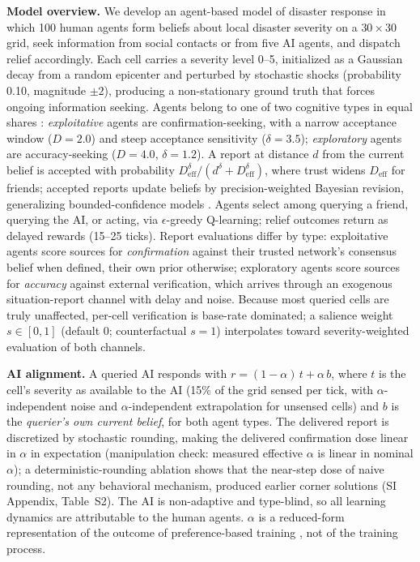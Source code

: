 \documentclass[pdflatex,sn-nature]{sn-jnl}
\begin{document}
\textbf{Model overview.} We develop an agent-based model of disaster response in which 100 human agents form beliefs about local disaster severity on a $30 \times 30$ grid, seek information from social contacts or from five AI agents, and dispatch relief accordingly. Each cell carries a severity level 0--5, initialized as a Gaussian decay from a random epicenter and perturbed by stochastic shocks (probability 0.10, magnitude $\pm 2$), producing a non-stationary ground truth that forces ongoing information seeking. Agents belong to one of two cognitive types in equal shares \citep{march1991exploration}: \emph{exploitative} agents are confirmation-seeking, with a narrow acceptance window ($D = 2.0$) and steep acceptance sensitivity ($\delta = 3.5$); \emph{exploratory} agents are accuracy-seeking ($D = 4.0$, $\delta = 1.2$). A report at distance $d$ from the current belief is accepted with probability $D_{\mathrm{eff}}^{\delta} / (d^{\delta} + D_{\mathrm{eff}}^{\delta})$, where trust widens $D_{\mathrm{eff}}$ for friends; accepted reports update beliefs by precision-weighted Bayesian revision, generalizing bounded-confidence models \citep{deffuant2000mixing,hegselmann2002opinion}. Agents select among querying a friend, querying the AI, or acting, via $\epsilon$-greedy Q-learning; relief outcomes return as delayed rewards (15--25 ticks). Report evaluations differ by type: exploitative agents score sources for \emph{confirmation} against their trusted network's consensus belief when defined, their own prior otherwise; exploratory agents score sources for \emph{accuracy} against external verification, which arrives through an exogenous situation-report channel with delay and noise. Because most queried cells are truly unaffected, per-cell verification is base-rate dominated; a salience weight $s \in [0,1]$ (default 0; counterfactual $s=1$) interpolates toward severity-weighted evaluation of both channels.

\textbf{AI alignment.} A queried AI responds with $r = (1-\alpha)\,t + \alpha\,b$, where $t$ is the cell's severity as available to the AI (15\% of the grid sensed per tick, with $\alpha$-independent noise and $\alpha$-independent extrapolation for unsensed cells) and $b$ is the \emph{querier's own current belief}, for both agent types. The delivered report is discretized by stochastic rounding, making the delivered confirmation dose linear in $\alpha$ in expectation (manipulation check: measured effective $\alpha$ is linear in nominal $\alpha$); a deterministic-rounding ablation shows that the near-step dose of naive rounding, not any behavioral mechanism, produced earlier corner solutions (SI Appendix, Table~S2). The AI is non-adaptive and type-blind, so all learning dynamics are attributable to the human agents. $\alpha$ is a reduced-form representation of the outcome of preference-based training \citep{christiano2017deep,ouyang2022training,sharma2023sycophancy}, not of the training process.
\end{document}
